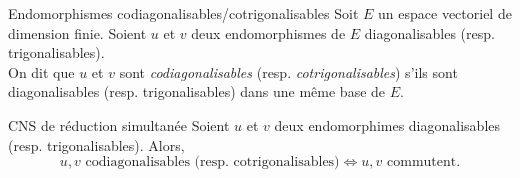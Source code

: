 \begin{defi}{Endomorphismes codiagonalisables/cotrigonalisables}
    Soit $E$ un espace vectoriel de dimension finie. Soient $u$ et $v$ deux endomorphismes de $E$ diagonalisables (resp. trigonalisables). \\
    On dit que $u$ et $v$ sont \emph{codiagonalisables} (resp. \emph{cotrigonalisables}) s'ils sont diagonalisables (resp. trigonalisables) dans une même base de $E$.
\end{defi}

\begin{prop}{CNS de réduction simultanée}
    Soient $u$ et $v$ deux endomorphimes diagonalisables (resp. trigonalisables). Alors, 
    $$u, v \text{ codiagonalisables (resp. cotrigonalisables)} \Longleftrightarrow u, v \text{ commutent}.$$
\end{prop}

